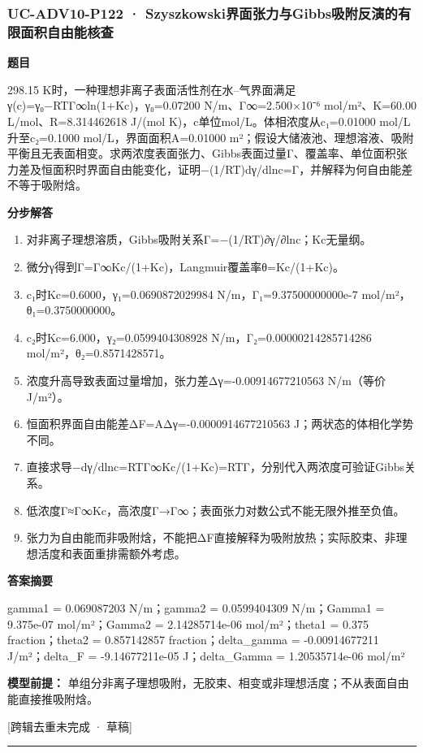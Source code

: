 \documentclass[UTF8,11pt,a4paper]{ctexart}
\begin{document}
\subsubsection*{UC-ADV10-P122 · Szyszkowski界面张力与Gibbs吸附反演的有限面积自由能核查}
\noindent\textbf{题目}\par
298.15 K时，一种理想非离子表面活性剂在水–气界面满足γ(c)=γ₀−RTΓ∞ln(1+Kc)，γ₀=0.07200 N/m、Γ∞=2.500×10⁻⁶ mol/m²、K=60.00 L/mol、R=8.314462618 J/(mol K)，c单位mol/L。体相浓度从c₁=0.01000 mol/L升至c₂=0.1000 mol/L，界面面积A=0.01000 m²；假设大储液池、理想溶液、吸附平衡且无表面相变。求两浓度表面张力、Gibbs表面过量Γ、覆盖率、单位面积张力差及恒面积时界面自由能变化，证明−(1/RT)dγ/dlnc=Γ，并解释为何自由能差不等于吸附焓。\par
\medskip\noindent\textbf{分步解答}
\begin{enumerate}
\item 对非离子理想溶质，Gibbs吸附关系Γ=−(1/RT)∂γ/∂lnc；Kc无量纲。
\item 微分γ得到Γ=Γ∞Kc/(1+Kc)，Langmuir覆盖率θ=Kc/(1+Kc)。
\item c₁时Kc=0.6000，γ₁=0.0690872029984 N/m，Γ₁=9.37500000000e-7 mol/m²，θ₁=0.3750000000。
\item c₂时Kc=6.000，γ₂=0.0599404308928 N/m，Γ₂=0.00000214285714286 mol/m²，θ₂=0.8571428571。
\item 浓度升高导致表面过量增加，张力差Δγ=-0.00914677210563 N/m（等价J/m²）。
\item 恒面积界面自由能差ΔF=AΔγ=-0.0000914677210563 J；两状态的体相化学势不同。
\item 直接求导−dγ/dlnc=RTΓ∞Kc/(1+Kc)=RTΓ，分别代入两浓度可验证Gibbs关系。
\item 低浓度Γ≈Γ∞Kc，高浓度Γ→Γ∞；表面张力对数公式不能无限外推至负值。
\item 张力为自由能而非吸附焓，不能把ΔF直接解释为吸附放热；实际胶束、非理想活度和表面重排需额外考虑。
\end{enumerate}
\noindent\textbf{答案摘要}\par
gamma1 = 0.069087203 N/m；gamma2 = 0.0599404309 N/m；Gamma1 = 9.375e-07 mol/m²；Gamma2 = 2.14285714e-06 mol/m²；theta1 = 0.375 fraction；theta2 = 0.857142857 fraction；delta\_gamma = -0.00914677211 J/m²；delta\_F = -9.14677211e-05 J；delta\_Gamma = 1.20535714e-06 mol/m²\par
\noindent\textbf{模型前提：}
单组分非离子理想吸附，无胶束、相变或非理想活度；不从表面自由能直接推吸附焓。\par
\noindent\textcolor{red!65!black}{[跨辑去重未完成 · 草稿]} \par
\medskip\hrule\medskip
\clearpage
\end{document}
